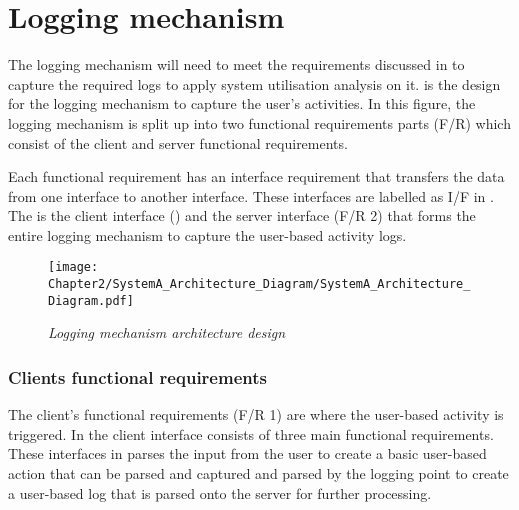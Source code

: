 \section{Logging mechanism}\label{Ch2:LoggingMechanism} The logging mechanism will need to meet the requirements discussed in  to capture the required logs to apply system utilisation analysis on it.  is the design for the logging mechanism to capture the user's activities. In this figure, the logging mechanism is split up into two functional requirements parts (F/R) which consist of the client and server functional requirements.\par Each functional requirement has an interface requirement that transfers the data from one interface to another interface. These interfaces are labelled as I/F in . The  is the client interface (\phase) and the server interface (F/R 2) that forms the entire logging mechanism to capture the user-based activity logs.

\begin{figure}[!htb] %
	\centering %
	\texttt{[image: Chapter2/SystemA\_Architecture\_Diagram/SystemA\_Architecture\_Diagram.pdf]}
	\caption[Logging mechanism architecture design]
	{\textit{Logging mechanism architecture design}}\label{fig:ch2_systemDesign}
\end{figure}

\subsubsection{Clients functional requirements}
The client's functional requirements (F/R 1) are where the user-based activity is triggered. In  the client interface consists of three main functional requirements. These interfaces in  parses the input from the user to create a basic user-based action that can be parsed and captured and parsed by the logging point to create a user-based log that is parsed onto the server for further processing. 

